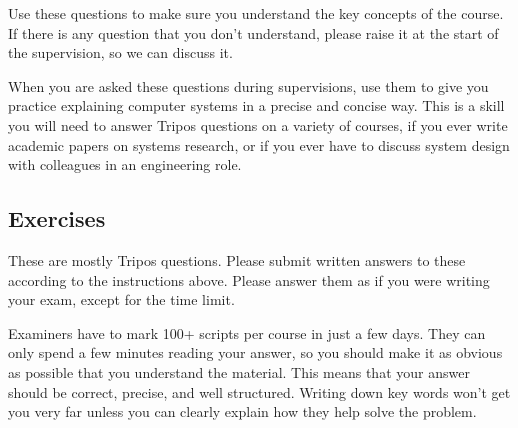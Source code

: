 \documentclass[12pt,a4paper,oneside,openright]{report}
\begin{document}
Use these questions to make sure you understand the key concepts of
the course. If there is any question that you don't understand, please
raise it at the start of the supervision, so we can discuss it.

When you are asked these questions during supervisions, use them to
give you practice explaining computer systems in a precise and concise
way. This is a skill you will need to answer Tripos questions on a
variety of courses, if you ever write academic papers on systems
research, or if you ever have to discuss system design with colleagues
in an engineering role.
  
\subsection*{Exercises}

These are mostly Tripos questions. Please submit written answers to
these according to the instructions above. Please answer them as if
you were writing your exam, except for the time limit.

Examiners have to mark 100+ scripts per course in just a few
days. They can only spend a few minutes reading your answer,
so you should make it as obvious as possible that you understand the
material. This means that your answer should be correct, precise, and
well structured. Writing down key words won't get you very far unless
you can clearly explain how they help solve the problem.


  
\end{document}

